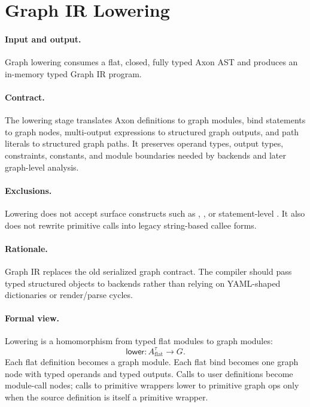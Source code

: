 \section{Graph IR Lowering}

\paragraph{Input and output.}
Graph lowering consumes a flat, closed, fully typed Axon AST and produces an
in-memory typed Graph IR program.

\paragraph{Contract.}
The lowering stage translates Axon definitions to graph modules, bind
statements to graph nodes, multi-output expressions to structured graph
outputs, and path literals to structured graph paths.  It preserves operand
types, output types, constraints, constants, and module boundaries needed by
backends and later graph-level analysis.

\paragraph{Exclusions.}
Lowering does not accept surface constructs such as , ,
or statement-level .  It also does not rewrite primitive calls into
legacy string-based callee forms.

\paragraph{Rationale.}
Graph IR replaces the old serialized graph contract.  The compiler should pass
typed structured objects to backends rather than relying on YAML-shaped
dictionaries or render/parse cycles.

\paragraph{Formal view.}
Lowering is a homomorphism from typed flat modules to graph modules:
\[
  \mathsf{lower}: A_{\mathrm{flat}}^{\tau} \rightarrow G.
\]
Each flat definition becomes a graph module.  Each flat bind becomes one graph
node with typed operands and typed outputs.  Calls to user definitions become
module-call nodes; calls to primitive wrappers lower to primitive graph ops
only when the source definition is itself a primitive wrapper.


